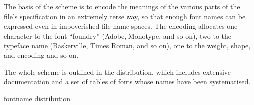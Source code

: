 The basis of the scheme is to encode the meanings of the various parts
of the file's specification in an extremely terse way, so that enough
font names can be expressed even in impoverished file name-spaces.  The
encoding allocates one character to the font ``foundry'' (Adobe, Monotype,
and so on), two to the typeface name (Baskerville, Times Roman, and so
on), one to the weight, shape, and encoding and so on.  

The whole scheme is outlined in the  distribution,
which includes extensive documentation and a set of tables of fonts
whose names have been systematised.
\begin{ctanrefs}
\item[fontname distribution]
\end{ctanrefs}

